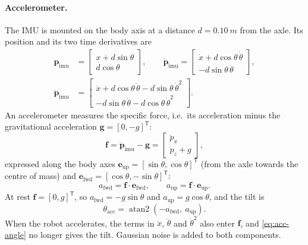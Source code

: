 \paragraph{Accelerometer.} The IMU is mounted on the body axis at a distance
$d = \SI{0.10}{m}$ from the axle. Its position and its two time derivatives are
\begin{align}
  \bm p_{\mathrm{imu}} &= \begin{bmatrix} x + d\sin\theta \\ d\cos\theta \end{bmatrix}, \qquad
  \dot{\bm p}_{\mathrm{imu}} = \begin{bmatrix} \dot x + d\cos\theta\,\dot\theta \\ -d\sin\theta\,\dot\theta \end{bmatrix}, \\
  \ddot{\bm p}_{\mathrm{imu}} &= \begin{bmatrix}
    \ddot x + d\cos\theta\,\ddot\theta - d\sin\theta\,\dot\theta^2 \\
    -d\sin\theta\,\ddot\theta - d\cos\theta\,\dot\theta^2 \end{bmatrix} .
\end{align}
An accelerometer measures the specific force, i.e.\ its acceleration minus the
gravitational acceleration $\bm g = [0, -g]^{\mathsf T}$:
\begin{equation}
  \bm f = \ddot{\bm p}_{\mathrm{imu}} - \bm g
  = \begin{bmatrix} \ddot p_x \\ \ddot p_z + g \end{bmatrix} ,
\end{equation}
expressed along the body axes
$\bm e_{\mathrm{up}} = [\sin\theta, \cos\theta]^{\mathsf T}$ (from the axle
towards the centre of mass) and
$\bm e_{\mathrm{fwd}} = [\cos\theta, -\sin\theta]^{\mathsf T}$:
\begin{equation}
  a_{\mathrm{fwd}} = \bm f\cdot\bm e_{\mathrm{fwd}} , \qquad
  a_{\mathrm{up}} = \bm f\cdot\bm e_{\mathrm{up}} .
\end{equation}
At rest $\bm f = [0, g]^{\mathsf T}$, so $a_{\mathrm{fwd}} = -g\sin\theta$ and
$a_{\mathrm{up}} = g\cos\theta$, and the tilt is
\begin{equation}
  \theta_{\mathrm{acc}} = \operatorname{atan2}\left(-a_{\mathrm{fwd}},\ a_{\mathrm{up}}\right) .
  \label{eq:acc-angle}
\end{equation}
When the robot accelerates, the terms in $\ddot x$, $\ddot\theta$ and
$\dot\theta^2$ also enter $\bm f$, and \cref{eq:acc-angle} no longer gives the
tilt. Gaussian noise is added to both components.

